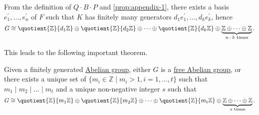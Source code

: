 From the definition of \(Q\cdot B\cdot P\) and \autoref{prop:appendix-1}, there exists a basis \(e_1^\prime, \dots , e_{n} ^\prime  \) of \(F\) such
that \(K\) has finitely many generators \(d_1 e_1^\prime , \dots , d_{k} e_{k} ^\prime\), hence
\[
	G\cong \quotient{\mathbb{Z} }{d_1 \mathbb{Z} } \oplus \quotient{\mathbb{Z} }{d_2 \mathbb{Z} } \oplus \dots \oplus \quotient{\mathbb{Z} }{d_k \mathbb{Z} }  \oplus \underbrace{\mathbb{Z} \oplus \dots \oplus \mathbb{Z}  }_{n-k \text{ times}}.
\]

This leads to the following important theorem.

\begin{theorem}\label{thm:fundamental-theorem-of-finitely-generalted-Abelian-group}
	Given a finitely generated \hyperref[def:Abelian-group]{Abelian group}, either \(G\) is a \hyperref[def:free-Abelian-group]{free Abelian group}, or there exists
	a unique set of \(\{m_{i}\in \mathbb{Z} \mid  m_{i} > 1, i = 1, \dots , t \}\) such that \(m_1 \mid m_2 \mid \dots \mid m_t \) and a unique non-negative integer \(s\)
	such that
	\[
		G\cong \quotient{\mathbb{Z} }{m_1 \mathbb{Z} } \oplus \quotient{\mathbb{Z} }{m_2 \mathbb{Z} } \oplus \dots \oplus \quotient{\mathbb{Z} }{m_t \mathbb{Z} }  \oplus \underbrace{\mathbb{Z} \oplus \dots \oplus \mathbb{Z}  }_{s \text{ times}}.
	\]
\end{theorem}
